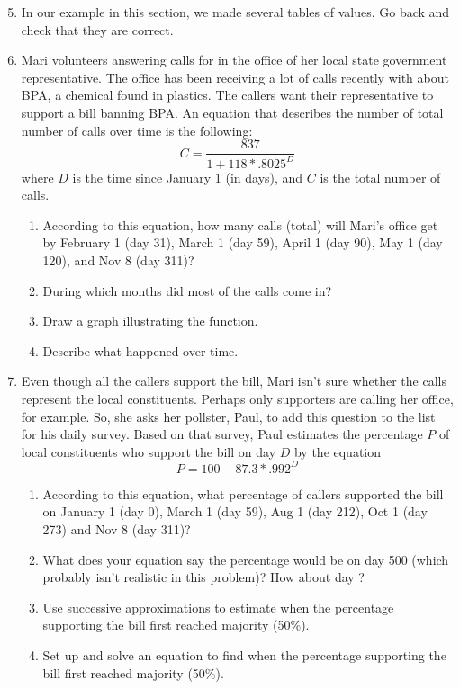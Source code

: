 \begin{enumerate} 
\setcounter{enumi}{4}
\item In our example in this section, we made several tables of values.  Go back and check that they are correct.

\item Mari volunteers answering calls for in the office of her local state government representative.  The office has been receiving a lot of calls recently with about BPA, a chemical found in plastics.  The callers want their representative to support a bill banning BPA.  An equation that describes the number of total number of calls over time is the following:
$$ C=\frac{837}{1+118\ast .8025^D}$$ %
where $D$ is the time since January 1 (in days), and $C$ is the total number of calls.

\begin{enumerate}
\item According to this equation, how many calls (total) will Mari's office get by February 1 (day 31), March 1 (day 59), April 1 (day 90), May 1 (day 120), and Nov 8 (day 311)?
\item During which months did most of the calls come in? 
\item Draw a graph illustrating the function.
\item Describe what happened over time.
\end{enumerate}

\item Even though all the callers support the bill, Mari isn't sure whether the calls represent the local constituents.  Perhaps only supporters are calling her office, for example.  So, she asks her pollster, Paul, to add this question to the list for his daily survey.  Based on that survey, Paul estimates the percentage $P$ of local constituents who support the bill on day $D$ by the equation $$P =100 - 87.3 \ast .992^D$$ %
\begin{enumerate}
\item According to this equation, what percentage of callers supported the bill on January 1 (day 0), March 1 (day 59), Aug 1 (day 212), Oct 1 (day 273) and Nov 8 (day 311)?
\item What does your equation say the percentage would be on day 500 (which probably isn't realistic in this problem)?  How about day ?
\item Use successive approximations to estimate when the percentage supporting the bill first reached  majority (50\%).
\item Set up and solve an equation to find  when the percentage supporting the bill first reached  majority (50\%).
\end{enumerate}
 

\end{enumerate}
